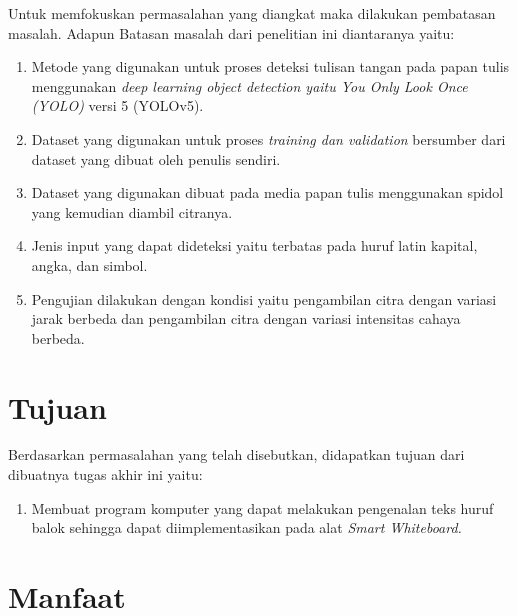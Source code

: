 Untuk memfokuskan permasalahan yang diangkat maka dilakukan pembatasan masalah. Adapun Batasan masalah dari penelitian ini diantaranya yaitu:
\begin{enumerate}[nolistsep]
    \item Metode yang digunakan untuk proses deteksi tulisan tangan pada papan tulis menggunakan \textit{deep learning object detection \textnormal{yaitu} You Only Look Once (YOLO)} versi 5 (YOLOv5).
    \item Dataset yang digunakan untuk proses \textit{training \textnormal{dan} validation} bersumber dari dataset yang dibuat oleh penulis sendiri.
    \item Dataset yang digunakan dibuat pada media papan tulis menggunakan spidol yang kemudian diambil citranya.
    \item Jenis input yang dapat dideteksi yaitu terbatas pada huruf latin kapital, angka, dan simbol.
    \item Pengujian dilakukan dengan kondisi yaitu pengambilan citra dengan variasi jarak berbeda dan pengambilan citra dengan variasi intensitas cahaya berbeda. 
\end{enumerate} 

\section{Tujuan}
\label{sec:Tujuan}

Berdasarkan permasalahan yang telah disebutkan, didapatkan tujuan dari dibuatnya tugas akhir ini yaitu:
\begin{enumerate}[nolistsep]
    \item Membuat program komputer yang dapat melakukan pengenalan teks huruf balok sehingga dapat diimplementasikan pada alat \textit{Smart Whiteboard.}
\end{enumerate}


\section{Manfaat}
\label{sec:manfaat}

